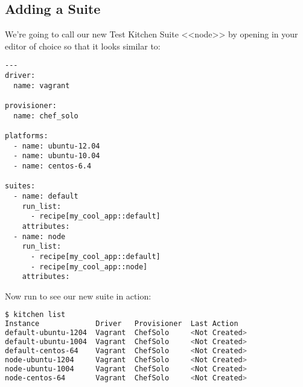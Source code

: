 \subsection{Adding a Suite}

We're going to call our new Test Kitchen Suite <<node>> by opening  in your editor of choice so that it looks similar to:

\begin{lstlisting}[label=lst:testing-test-kitchen34]
---
driver:
  name: vagrant

provisioner:
  name: chef_solo

platforms:
  - name: ubuntu-12.04
  - name: ubuntu-10.04
  - name: centos-6.4

suites:
  - name: default
    run_list:
      - recipe[my_cool_app::default]
    attributes:
  - name: node
    run_list:
      - recipe[my_cool_app::default]
      - recipe[my_cool_app::node]
    attributes:
\end{lstlisting}

Now run  to see our new suite in action:

\begin{lstlisting}[language=Bash,label=lst:testing-test-kitchen35]
$ kitchen list
Instance             Driver   Provisioner  Last Action
default-ubuntu-1204  Vagrant  ChefSolo     <Not Created>
default-ubuntu-1004  Vagrant  ChefSolo     <Not Created>
default-centos-64    Vagrant  ChefSolo     <Not Created>
node-ubuntu-1204     Vagrant  ChefSolo     <Not Created>
node-ubuntu-1004     Vagrant  ChefSolo     <Not Created>
node-centos-64       Vagrant  ChefSolo     <Not Created>
\end{lstlisting}
